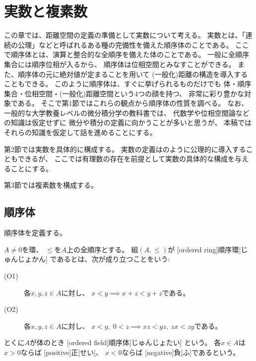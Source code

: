 \documentclass[report]{jlreq}
\begin{document}
%
\chapter{実数と複素数}

この章では、距離空間の定義の準備として実数について考える。
実数とは、「連続の公理」などと呼ばれるある種の完備性を備えた順序体のことである。
ここで順序体とは、演算と整合的な全順序を備えた体のことである。
一般に全順序集合には順序位相が入るから、
順序体は位相空間とみなすことができる。
また、順序体の元に絶対値が定まることを用いて
(一般化)距離の構造を導入することもできる。
このように順序体は、すぐに挙げられるものだけでも
体・順序集合・位相空間・(一般化)距離空間という4つの顔を持つ、
非常に彩り豊かな対象である。
そこで第1節ではこれらの観点から順序体の性質を調べる。
なお、一般的な大学教養レベルの微分積分学の教科書では、
代数学や位相空間論などの知識は仮定せずに
微分や積分の定義に向かうことが多いと思うが、
本稿ではそれらの知識を仮定して話を進めることにする。

第2節では実数を具体的に構成する。
実数の定義は\cite{杉浦80}のように公理的に導入することもできるが、
ここでは有理数の存在を前提として実数の具体的な構成を与えることにする。

第3節では複素数を構成する。

%
\section{順序体}

順序体を定義する。

\begin{definition}[順序体]
    $A \neq 0$を環、
    $\le$を$A$上の全順序とする。
    組$(A, \le)$が
    [ordered ring]{順序環}[じゅんじょかん]
    であるとは、次が成り立つことをいう:
    \begin{description}
        \item[(O1)] 各$x, y, z \in A$に対し、
            $x < y \implies x + z < y + z$である。
        \item[(O2)] 各$x, y, z \in A$に対し、
            $x < y, \; 0 < z \implies xz < yz, \; zx < zy$である。
    \end{description}
    とくに$A$が体のとき
    [ordered field]{順序体}[じゅんじょたい]
    という。
    各$x \in A$は$x > 0$ならば
    [positive]{正}[せい]、
    $x < 0$ならば
    [negative]{負}[ふ]であるという。
\end{definition}
\end{document}
